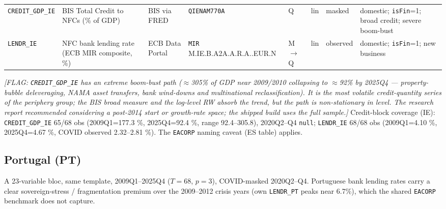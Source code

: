 \begin{longtable}{@{}p{}p{}p{}p{}p{}p{}p{}p{}@{}}
\texttt{CREDIT\_GDP\_IE} & BIS Total Credit to NFCs (\% of GDP) & BIS via FRED & \texttt{QIENAM770A} & Q & lin & masked & domestic; \texttt{isFin}=1; broad credit; severe boom-bust \\
\texttt{LENDR\_IE} & NFC bank lending rate (ECB MIR composite, \%) & ECB Data Portal & \texttt{MIR} M.\allowbreak IE.\allowbreak B.\allowbreak A2A.\allowbreak A.\allowbreak R.\allowbreak A.\allowbreak 2240.\allowbreak EUR.\allowbreak N & M$\to$Q & lin & observed & domestic; \texttt{isFin}=1; new business \\
\end{longtable}

\noindent\textit{[FLAG: \texttt{CREDIT\_GDP\_IE} has an extreme boom-bust path
($\approx$305\% of GDP near 2009/2010 collapsing to $\approx$92\% by 2025Q4 ---
property-bubble deleveraging, NAMA asset transfers, bank wind-downs and
multinational reclassification). It is the most volatile credit-quantity series
of the periphery group; the BIS broad measure and the log-level RW absorb the
trend, but the path is non-stationary in level. The research report recommended
considering a post-2014 start or growth-rate space; the shipped build uses the
full sample.]}
Credit-block coverage (IE): \texttt{CREDIT\_GDP\_IE} 65/68 obs (2009Q1=177.3 \%,
2025Q4=92.4 \%, range 92.4--305.8), 2020Q2--Q4 \texttt{null}; \texttt{LENDR\_IE}
68/68 obs (2009Q1=4.10 \%, 2025Q4=4.67 \%, COVID observed 2.32--2.81 \%). The
\texttt{EACORP} naming caveat (ES table) applies.

\subsection{Portugal (PT)}\label{sec:data:PT}

A 23-variable bloc, same template, 2009Q1--2025Q4 ($T=68$, $p=3$), COVID-masked
2020Q2--Q4. Portuguese bank lending rates carry a clear sovereign-stress /
fragmentation premium over the 2009--2012 crisis years (own \texttt{LENDR\_PT}
peaks near 6.7\%), which the shared \texttt{EACORP} benchmark does not capture.

